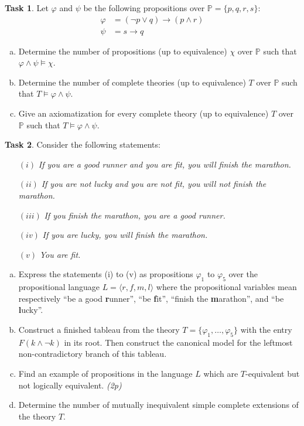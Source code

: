 \documentclass[a4paper]{amsart}
\theoremstyle{definition}
\newtheorem{task}{Task}
\begin{document}
\begin{task}
Let $\varphi$ and $\psi$ be the following propositions over $\mathbb P=\{p, q, r, s\}$:
\begin{align*}
    \varphi &= (\neg p \vee  q)\to(p\wedge r)\\
    \psi &= s\to q
\end{align*}
\begin{enumerate}[(a)]
    \item Determine the number of propositions (up to equivalence) $\chi$ over $\mathbb P$ such that $\varphi\wedge\psi\models\chi$.
    \item Determine the number of complete theories (up to equivalence) $T$ over $\mathbb P$ such that $T\models\varphi\wedge\psi$.
    \item Give an axiomatization for every complete theory (up to equivalence) $T$ over $\mathbb P$ such that $T\models\varphi\wedge\psi$.
\end{enumerate}
\end{task}


\begin{task}
Consider the following statements:
\begin{enumerate}
\item[$(i)$] {\it If you are a good runner and you are fit, you will finish the marathon.}
\item[$(ii)$] {\it If you are not lucky and you are not fit, you will not finish the marathon.}
\item[$(iii)$]{\it If you finish the marathon, you are a good runner.}
\item[$(iv)$] {\it If you are lucky, you will finish the marathon.}
\item[$(v)$] {\it You are fit.}
\end{enumerate}


\begin{enumerate}[(a)]
\item Express the statements (i) to (v) as propositions $\varphi_1$ to $\varphi_5$ over the propositional language $L=\langle r, f, m, l\rangle$ where the propositional variables mean respectively ``be a good \textbf{r}unner'', ``be \textbf{f}it'', ``finish the \textbf{m}arathon'', and ``be \textbf{l}ucky''.
\item Construct a finished tableau from the theory $T=\{\varphi_1,\dots,\varphi_5\}$ with the entry $F (k \wedge \neg k)$ in its root. Then construct the canonical model for the leftmost non-contradictory branch of this tableau.
\item Find an example of propositions in the language $L$ which are $T$-equivalent but not logically equivalent. {\it (2p)}
\item Determine the number of mutually inequivalent simple complete extensions of the theory $T$. 
\end{enumerate}
\end{task}
\end{document}
